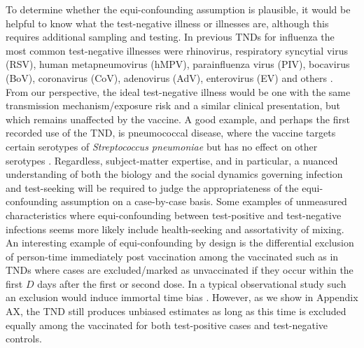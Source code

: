 \documentclass[11pt]{article}
\begin{document}
To determine whether the equi-confounding assumption is plausible, it would be helpful to know what the test-negative illness or illnesses are, although this requires additional sampling and testing. In previous TNDs for influenza the most common test-negative illnesses were rhinovirus, respiratory syncytial virus (RSV), human metapneumovirus (hMPV), parainfluenza virus (PIV), bocavirus (BoV), coronavirus (CoV), adenovirus (AdV), enterovirus (EV) and others \cite{chua_use_2020-1}. From our perspective, the ideal test-negative illness would be one with the same transmission mechanism/exposure risk and a similar clinical presentation, but which remains unaffected by the vaccine. A good example, and perhaps the first recorded use of the TND, is pneumococcal disease, where the vaccine targets certain serotypes of \textit{Streptococcus pneumoniae} but has no effect on other serotypes \cite{broome_pneumococcal_1980}. Regardless, subject-matter expertise, and in particular, a nuanced understanding of both the biology and the social dynamics governing infection and test-seeking will be required to judge the appropriateness of the equi-confounding assumption on a case-by-case basis. Some examples of unmeasured characteristics where equi-confounding between test-positive and test-negative infections seems more likely include health-seeking and assortativity of mixing. An interesting example of equi-confounding by design is the differential exclusion of person-time immediately post vaccination among the vaccinated such as in TNDs where cases are excluded/marked as unvaccinated if they occur within the first $D$ days after the first or second dose. In a typical observational study such an exclusion would induce immortal time bias \cite{suissa_immortal_2008}. However, as we show in Appendix AX, the TND still produces unbiased estimates as long as this time is excluded equally among the vaccinated for both test-positive cases and test-negative controls. 
\end{document}
